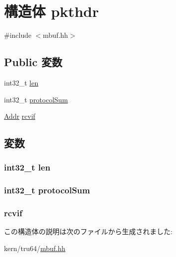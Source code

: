 \hypertarget{structtru64_1_1pkthdr}{
\section{構造体 pkthdr}
\label{structtru64_1_1pkthdr}
}


{\ttfamily \#include $<$mbuf.hh$>$}\subsection*{Public 変数}
\begin{DoxyCompactItemize}
\item 
int32\_\-t \hyperlink{structtru64_1_1pkthdr_a6858c4011b5cad020222e9ca5c2786f5}{len}
\item 
int32\_\-t \hyperlink{structtru64_1_1pkthdr_a04669846c1174fea5ec850923fbab711}{protocolSum}
\item 
\hyperlink{base_2types_8hh_af1bb03d6a4ee096394a6749f0a169232}{Addr} \hyperlink{structtru64_1_1pkthdr_a9cfd5f2337c109b70b5ba8c6454586e2}{rcvif}
\end{DoxyCompactItemize}


\subsection{変数}
\hypertarget{structtru64_1_1pkthdr_a6858c4011b5cad020222e9ca5c2786f5}{
\subsubsection[{len}]{\setlength{\rightskip}{0pt plus 5cm}int32\_\-t {\bf len}}}
\label{structtru64_1_1pkthdr_a6858c4011b5cad020222e9ca5c2786f5}
\hypertarget{structtru64_1_1pkthdr_a04669846c1174fea5ec850923fbab711}{
\subsubsection[{protocolSum}]{\setlength{\rightskip}{0pt plus 5cm}int32\_\-t {\bf protocolSum}}}
\label{structtru64_1_1pkthdr_a04669846c1174fea5ec850923fbab711}
\hypertarget{structtru64_1_1pkthdr_a9cfd5f2337c109b70b5ba8c6454586e2}{
\subsubsection[{rcvif}]{ {\bf rcvif}}}
\label{structtru64_1_1pkthdr_a9cfd5f2337c109b70b5ba8c6454586e2}


この構造体の説明は次のファイルから生成されました:\begin{DoxyCompactItemize}
\item 
kern/tru64/\hyperlink{mbuf_8hh}{mbuf.hh}\end{DoxyCompactItemize}
